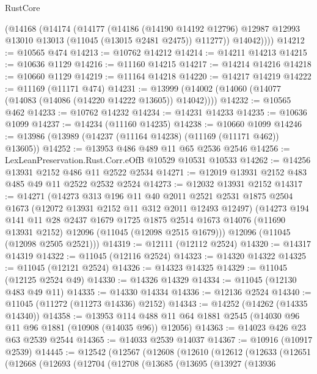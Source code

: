 \begin{lexlean}{RustCore}
\begin{coremodule}
        (@14168
          (@14174
            (@14177
              (@14186
                (@14190 @14192 @12796)
                @12987
                @12993
                @13010
                @13013
                (@11045 (@13015 @2481 @2475))
                @11277))
            @14042))))
@14212 := @10565 @474
@14213 := @10762 @14212
@14214 := @14211 @14213
@14215 := @10636 @1129
@14216 := @11160 @14215
@14217 := @14214 @14216
@14218 := @10660 @1129
@14219 := @11164 @14218
@14220 := @14217 @14219
@14222 := @11169 (@11171 @474)
@14231 := @13999 (@14002 (@14060 (@14077 (@14083 (@14086 (@14220 @14222 @13605)) @14042))))
@14232 := @10565 @462
@14233 := @10762 @14232
@14234 := @14231 @14233
@14235 := @10636 @1099
@14237 := @14234 (@11160 @14235)
@14238 := @10660 @1099
@14246 := @13986 (@13989 (@14237 (@11164 @14238) (@11169 (@11171 @462)) @13605))
@14252 := @13953 @486 @489 @11 @65 @2536 @2546
@14256 := LexLeanPreservation.Rust.Corr.eOfB @10529 @10531 @10533
@14262 := @14256 @13931 @2152 @486 @11 @2522 @2534
@14271 := @12019 @13931 @2152 @483 @485 @49 @11 @2522 @2532 @2524
@14273 := @12032 @13931 @2152
@14317 := @14271
    (@14273
      @313
      @196
      @11
      @40
      @2011
      @2521
      @2531
      @1875
      @2504
      @1673
      (@12072 @13931 @2152 @11 @312 @2011 @12493 @12497)
      (@14273
        @194
        @141
        @11
        @28
        @2437
        @1679
        @1725
        @1875
        @2514
        @1673
        @14076
        (@11690 @13931 @2152)
        @12096
        (@11045 (@12098 @2515 @1679)))
      @12096
      (@11045 (@12098 @2505 @2521)))
@14319 := @12111 (@12112 @2524)
@14320 := @14317 @14319
@14322 := @11045 (@12116 @2524)
@14323 := @14320 @14322
@14325 := @11045 (@12121 @2524)
@14326 := @14323 @14325
@14329 := @11045 (@12125 @2524 @49)
@14330 := @14326 @14329
@14334 := @11045 (@12130 @483 @49 @11)
@14335 := @14330 @14334
@14336 := @12136 @2524
@14340 := @11045 (@11272 (@11273 @14336) @2152)
@14343 := @14252 (@14262 (@14335 @14340))
@14358 := @13953
    @114
    @488
    @11
    @64
    @1881
    @2545
    (@14030 @96 @11 @96 @1881 (@10908 (@14035 @96)) @12056)
@14363 := @14023 @426 @23 @63 @2539 @2544
@14365 := @14033 @2539 @14037
@14367 := @10916 (@10917 @2539)
@14445 := @12542
    (@12567
      (@12608
        (@12610
          (@12612
            (@12633
              (@12651
                (@12668
                  (@12693
                    (@12704
                      (@12708
                        (@13685
                          (@13695
                            (@13927
                              (@13936

\end{coremodule}
\end{lexlean}
